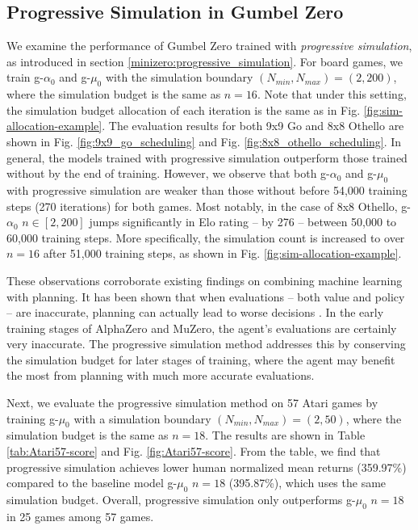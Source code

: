 \subsection{Progressive Simulation in Gumbel Zero}\label{exp:psg}
We examine the performance of Gumbel Zero trained with \textit{progressive simulation}, as introduced in section \ref{minizero:progressive_simulation}.
For board games, we train g-$\alpha_0$ and g-$\mu_0$ with the simulation boundary $(N_{min}, N_{max})=(2, 200)$, where the simulation budget is the same as $n=16$.
Note that under this setting, the simulation budget allocation of each iteration is the same as in Fig. \ref{fig:sim-allocation-example}.
The evaluation results for both 9x9 Go and 8x8 Othello are shown in Fig. \ref{fig:9x9_go_scheduling} and Fig. \ref{fig:8x8_othello_scheduling}.
In general, the models trained with progressive simulation outperform those trained without by the end of training.
However, we observe that both g-$\alpha_0$ and g-$\mu_0$ with progressive simulation are weaker than those without before 54,000 training steps (270 iterations) for both games.
Most notably, in the case of 8x8 Othello, g-$\alpha_0$ $n\in [2, 200]$ jumps significantly in Elo rating -- by 276 -- between 50,000 to 60,000 training steps.
More specifically, the simulation count is increased to over $n=16$ after 51,000 training steps, as shown in Fig. \ref{fig:sim-allocation-example}.

These observations corroborate existing findings on combining machine learning with planning.
It has been shown that when evaluations -- both value and policy -- are inaccurate, planning can actually lead to worse decisions \cite{haque_road_2022}. 
In the early training stages of AlphaZero and MuZero, the agent's evaluations are certainly very inaccurate. 
The progressive simulation method addresses this by conserving the simulation budget for later stages of training, where the agent may benefit the most from planning with much more accurate evaluations.

Next, we evaluate the progressive simulation method on 57 Atari games by training g-$\mu_0$ with a simulation boundary $(N_{min}, N_{max})=(2, 50)$, where the simulation budget is the same as $n=18$.
The results are shown in Table \ref{tab:Atari57-score} and Fig. \ref{fig:Atari57-score}.
From the table, we find that progressive simulation achieves lower human normalized mean returns (359.97\%) compared to the baseline model g-$\mu_0$ $n=18$ (395.87\%), which uses the same simulation budget.
Overall, progressive simulation only outperforms g-$\mu_0$ $n=18$ in 25 games among 57 games.

